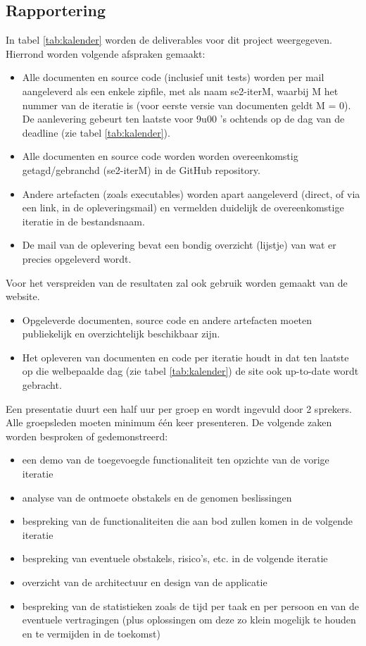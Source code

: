 \subsection{Rapportering}
In tabel \ref{tab:kalender} worden de deliverables voor dit project weergegeven. Hierrond worden volgende afspraken gemaakt:
\begin{itemize}
\item Alle documenten en source code (inclusief unit tests) worden per mail aangeleverd als een enkele zipfile, met als naam se2-iterM, waarbij M het nummer van de iteratie is (voor eerste versie van documenten geldt M = 0). De aanlevering gebeurt ten laatste voor 9u00 ’s ochtends op de dag van de deadline (zie tabel \ref{tab:kalender}).
\item Alle documenten en source code worden worden overeenkomstig getagd/gebranchd (se2-iterM) in de GitHub repository.
\item Andere artefacten (zoals executables) worden apart aangeleverd (direct, of via een link, in de opleveringsmail) en vermelden duidelijk de overeenkomstige iteratie in de bestandsnaam.
\item De mail van de oplevering bevat een bondig overzicht (lijstje) van wat er precies opgeleverd
wordt.
\end{itemize}
Voor het verspreiden van de resultaten zal ook gebruik worden gemaakt van de website. 
\begin{itemize}
\item Opgeleverde documenten, source code en andere artefacten moeten publiekelijk en overzichtelijk beschikbaar zijn.
\item Het opleveren van documenten en code per iteratie houdt in dat ten laatste op die welbepaalde dag (zie tabel \ref{tab:kalender}) de site ook up-to-date wordt gebracht.
\end{itemize}
Een presentatie duurt een half uur per groep en wordt ingevuld door 2 sprekers. Alle groepsleden moeten minimum \'{e}\'{e}n keer presenteren. De volgende zaken worden besproken of gedemonstreerd:
\begin{itemize}
\item een demo van de toegevoegde functionaliteit ten opzichte van de vorige iteratie
\item analyse van de ontmoete obstakels en de genomen beslissingen
\item bespreking van de functionaliteiten die aan bod zullen komen in de volgende iteratie
\item bespreking van eventuele obstakels, risico’s, etc. in de volgende iteratie
\item overzicht van de architectuur en design van de applicatie
\item bespreking van de statistieken zoals de tijd per taak en per persoon en van de eventuele vertragingen (plus oplossingen om deze zo klein mogelijk te houden en te vermijden in de toekomst)
\end{itemize}

